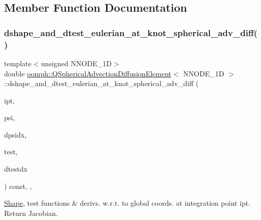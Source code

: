 \subsection{Member Function Documentation}
\mbox{\label{classoomph_1_1QSphericalAdvectionDiffusionElement_ac15987174b58e77489aa6e5f12b9db81}} 
\subsubsection{\texorpdfstring{dshape\+\_\+and\+\_\+dtest\+\_\+eulerian\+\_\+at\+\_\+knot\+\_\+spherical\+\_\+adv\+\_\+diff()}{dshape\_and\_dtest\_eulerian\_at\_knot\_spherical\_adv\_diff()}}
{\footnotesize\ttfamily template$<$unsigned N\+N\+O\+D\+E\+\_\+1D$>$ \\
double \hyperlink{classoomph_1_1QSphericalAdvectionDiffusionElement}{oomph\+::\+Q\+Spherical\+Advection\+Diffusion\+Element}$<$ N\+N\+O\+D\+E\+\_\+1D $>$\+::dshape\+\_\+and\+\_\+dtest\+\_\+eulerian\+\_\+at\+\_\+knot\+\_\+spherical\+\_\+adv\+\_\+diff (\begin{DoxyParamCaption}\item[{const unsigned \&}]{ipt,  }\item[{\hyperlink{classoomph_1_1Shape}{Shape} \&}]{psi,  }\item[{\hyperlink{classoomph_1_1DShape}{D\+Shape} \&}]{dpsidx,  }\item[{\hyperlink{classoomph_1_1Shape}{Shape} \&}]{test,  }\item[{\hyperlink{classoomph_1_1DShape}{D\+Shape} \&}]{dtestdx }\end{DoxyParamCaption}) const\hspace{0.3cm}{\ttfamily [inline]}, {\ttfamily [protected]}, {\ttfamily [virtual]}}



\hyperlink{classoomph_1_1Shape}{Shape}, test functions \& derivs. w.\+r.\+t. to global coords. at integration point ipt. Return Jacobian. 

